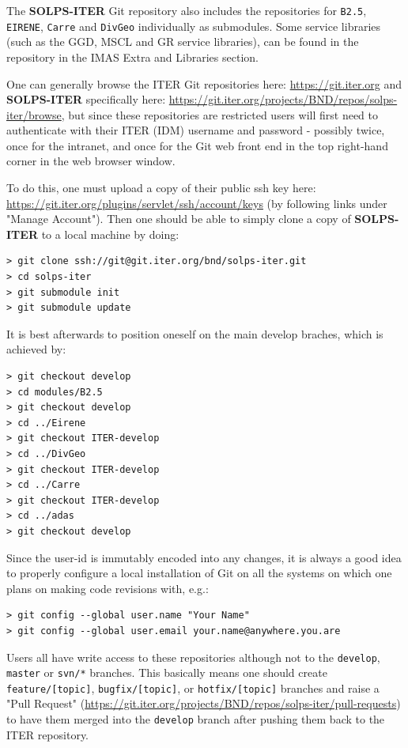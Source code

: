 \documentclass[a4paper,10pt]{report}
\newcommand\SOLPSITER{{\bf SOLPS-ITER} }
\begin{document}
The \SOLPSITER Git repository also includes the repositories for {\tt B2.5}, {\tt EIRENE}, {\tt Carre} and {\tt DivGeo} individually as submodules. Some service libraries (such as the GGD, MSCL and GR service libraries), can be found in the repository in the IMAS Extra and Libraries section.

One can generally browse the ITER Git repositories here: \href{https://git.iter.org}{https://git.iter.org} and \SOLPSITER specifically here: \href{https://git.iter.org/projects/BND/repos/solps-iter/browse}{https://git.iter.org/projects/BND/repos/solps-iter/browse}, but since these repositories are restricted users will first need to authenticate with their ITER (IDM) username and password - possibly twice, once for the intranet, and once for the Git web front end in the top right-hand corner in the web browser window.

To do this, one must upload a copy of their public ssh key here: \href{https://git.iter.org/plugins/servlet/ssh/account/keys}{https://git.iter.org/plugins/servlet/ssh/account/keys} (by following links under "Manage Account"). Then one should be able to simply clone a copy of \SOLPSITER to a local machine by doing:

\begin{verbatim}
> git clone ssh://git@git.iter.org/bnd/solps-iter.git
> cd solps-iter
> git submodule init
> git submodule update
\end{verbatim}

It is best afterwards to position oneself on the main develop braches, which is achieved by:

\begin{verbatim}
> git checkout develop
> cd modules/B2.5
> git checkout develop
> cd ../Eirene
> git checkout ITER-develop
> cd ../DivGeo
> git checkout ITER-develop
> cd ../Carre
> git checkout ITER-develop
> cd ../adas
> git checkout develop
\end{verbatim}

Since the user-id is immutably encoded into any changes, it is always a good idea to properly configure a local installation of Git on all the systems on which one plans on making code revisions with, e.g.:

\begin{verbatim}
> git config --global user.name "Your Name"
> git config --global user.email your.name@anywhere.you.are
\end{verbatim}

Users all have write access to these repositories although not to the {\tt develop}, {\tt master} or {\tt svn/*} branches.  This basically means one should create {\tt feature/[topic]}, {\tt bugfix/[topic]}, or {\tt hotfix/[topic]} branches and raise a "Pull Request" (\href{https://git.iter.org/projects/BND/repos/solps-iter/pull-requests}{https://git.iter.org/projects/BND/repos/solps-iter/pull-requests}) to have them merged into the {\tt develop} branch after pushing them back to the ITER repository.
\end{document}
